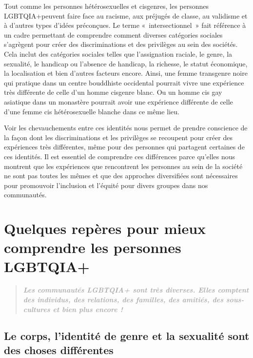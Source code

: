 \documentclass[12pt,openany]{book}
\begin{document}
\noindent Tout comme les personnes hétérosexuelles et cisgenres, les personnes \mbox{LGBTQIA+}peuvent faire face au racisme, aux préjugés de classe, au validisme et à d’autres types d’idées préconçues. Le terme \mbox{« intersectionnel »} fait référence à un cadre permettant de comprendre comment diverses catégories sociales s’agrègent pour créer des discriminations et des privilèges au sein des sociétés. Cela inclut des catégories sociales telles que l’assignation raciale, le genre, la sexualité, le handicap ou l’absence de handicap, la richesse, le statut économique, la localisation et bien d’autres facteurs encore. Ainsi, une femme transgenre noire qui pratique dans un centre bouddhiste occidental pourrait vivre une expérience très différente de celle d’un homme cisgenre blanc. Ou un homme cis gay asiatique dans un monastère pourrait avoir une expérience différente de celle d’une femme cis hétérosexuelle blanche dans ce même lieu.

Voir les chevauchements entre ces identités nous permet de prendre conscience de la façon dont les discriminations et les privilèges se recoupent pour créer des expériences très différentes, même pour des personnes qui partagent certaines de ces identités. Il est essentiel de comprendre ces différences parce qu’elles nous montrent que les expériences que rencontrent les personnes au sein de la société ne sont pas toutes les mêmes et que des approches diversifiées sont nécessaires pour promouvoir l’inclusion et l’équité pour divers groupes dans nos communautés.

\chapter*{Quelques repères pour mieux comprendre les personnes \mbox{LGBTQIA+}}

\begingroup
\addtolength\leftmargin{-0.1in}
\begin{quote}
\centering
\textit{\large \textbf{\textcolor{darkgray}{Les communautés \mbox{LGBTQIA+} sont très diverses. Elles comptent des individus, des relations, des familles, des amitiés, des sous-cultures et bien plus encore !}}}
\end{quote}
\endgroup

\section*{Le corps, l’identité de genre et la sexualité sont des choses différentes}
\end{document}

